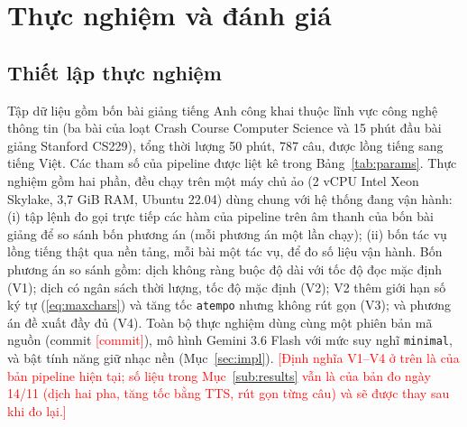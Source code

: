 \documentclass{IEEEtran}
\newcommand{\todo}[1]{\textcolor{red}{[#1]}}
\begin{document}
\section{Thực nghiệm và đánh giá}
\label{sec:exp}

\subsection{Thiết lập thực nghiệm}
Tập dữ liệu gồm bốn bài giảng tiếng Anh công khai thuộc lĩnh vực công nghệ thông tin (ba bài của loạt Crash Course Computer Science và 15 phút đầu bài giảng Stanford CS229), tổng thời lượng 50 phút, 787 câu, được lồng tiếng sang tiếng Việt. Các tham số của pipeline được liệt kê trong Bảng~\ref{tab:params}. Thực nghiệm gồm hai phần, đều chạy trên một máy chủ ảo (2 vCPU Intel Xeon Skylake, 3,7 GiB RAM, Ubuntu 22.04) dùng chung với hệ thống đang vận hành: (i) tập lệnh đo gọi trực tiếp các hàm của pipeline trên âm thanh của bốn bài giảng để so sánh bốn phương án (mỗi phương án một lần chạy); (ii) bốn tác vụ lồng tiếng thật qua nền tảng, mỗi bài một tác vụ, để đo số liệu vận hành. Bốn phương án so sánh gồm: dịch không ràng buộc độ dài với tốc độ đọc mặc định (V1); dịch có ngân sách thời lượng, tốc độ mặc định (V2); V2 thêm giới hạn số ký tự (\ref{eq:maxchars}) và tăng tốc \texttt{atempo} nhưng không rút gọn (V3); và phương án đề xuất đầy đủ (V4). Toàn bộ thực nghiệm dùng cùng một phiên bản mã nguồn (commit \todo{commit}), mô hình Gemini 3.6 Flash với mức suy nghĩ \texttt{minimal}, và bật tính năng giữ nhạc nền (Mục~\ref{sec:impl}). \todo{Định nghĩa V1--V4 ở trên là của bản pipeline hiện tại; số liệu trong Mục~\ref{sub:results} vẫn là của bản đo ngày 14/11 (dịch hai pha, tăng tốc bằng TTS, rút gọn từng câu) và sẽ được thay sau khi đo lại.}
\end{document}

